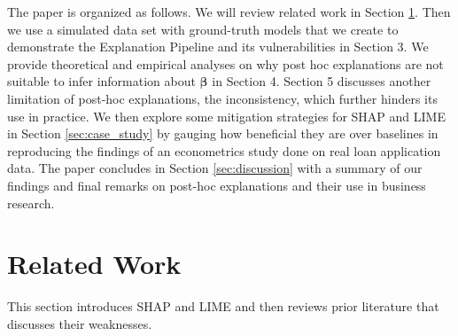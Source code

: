 \documentclass[mnsc,blindrev]{informs3}
\begin{document}

    The paper is organized as follows. We will review related work in Section \ref{sec:related_work}. Then we use a simulated data set with ground-truth models that we create to demonstrate the Explanation Pipeline and its vulnerabilities in Section 3.  We provide theoretical and empirical analyses on why post hoc explanations are not suitable to infer information about $\boldsymbol{\beta}$ in Section 4. Section 5 discusses another  limitation of post-hoc explanations, the inconsistency, which further hinders its use in practice. We then explore some mitigation strategies for SHAP and LIME in Section \ref{sec:case_study} by gauging how beneficial they are over baselines in reproducing the findings of an econometrics study done on real loan application data. The paper concludes in Section \ref{sec:discussion} with a summary of our findings and final remarks on post-hoc explanations and their use in business research.
    
\section{Related Work}
    \label{sec:related_work}
    This section introduces SHAP and LIME and then reviews prior literature that discusses their weaknesses. %
\end{document}
